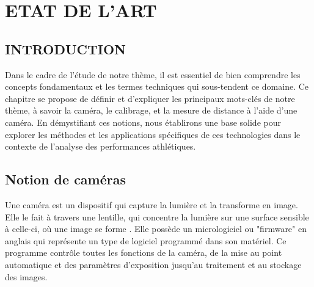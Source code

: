 \chapter{ETAT DE L'ART}
\begin{spacing}{1.2}
\minitoc
\thispagestyle{MyStyle}
\end{spacing}
\newpage

\section{INTRODUCTION}


Dans le cadre de l'étude de notre thème, il est essentiel de bien comprendre les concepts fondamentaux et les termes techniques qui sous-tendent ce domaine. Ce chapitre se propose de définir et d'expliquer les principaux mots-clés de notre thème, à savoir la caméra, le calibrage, et la mesure de distance à l'aide d'une caméra. En démystifiant ces notions, nous établirons une base solide pour explorer les méthodes et les applications spécifiques de ces technologies dans le contexte de l'analyse des performances athlétiques.


 
 
 \section{Notion de caméras}
 
 Une caméra est un dispositif qui capture la lumière et la transforme en image. Elle le fait à travers une lentille, qui concentre la lumière sur une surface sensible à celle-ci, où une image se forme \cite{noauthor_quest-ce_nodate}. Elle possède un micrologiciel ou "firmware" en anglais qui représente un type de logiciel programmé dans son matériel. Ce programme contrôle toutes les fonctions de la caméra, de la mise au point automatique et des paramètres d’exposition jusqu'au traitement et au stockage des images.
 

